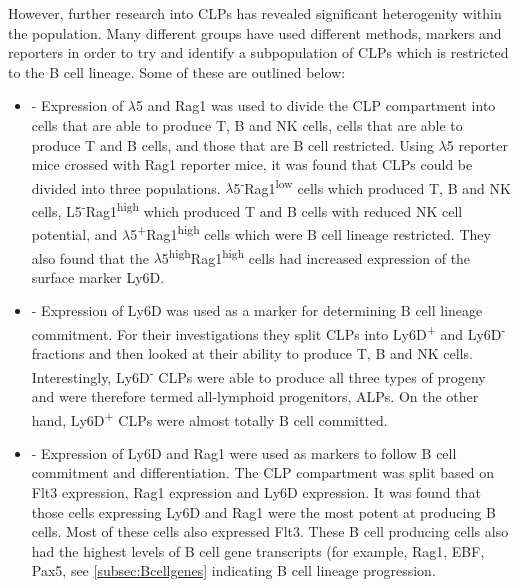 

However, further research into CLPs has revealed significant heterogenity within the population.
Many different groups have used different methods, markers and reporters in order to try and identify a subpopulation of CLPs which is restricted to the B cell lineage. 
Some of these are outlined below:
\begin{itemize}
\item \citet{Mansson2010} - Expression of $\lambda$5 and Rag1 was used to divide the CLP compartment into cells that are able to produce T, B and NK cells, cells that are able to produce T and B cells, and those that are B cell restricted.
Using $\lambda$5 reporter mice crossed with Rag1 reporter mice, it was found that CLPs could be divided into three populations.
$\lambda$5\textsuperscript{-}Rag1\textsuperscript{low} cells which produced T, B and NK cells, L5\textsuperscript{-}Rag1\textsuperscript{high} which produced T and B cells with reduced NK cell potential, and $\lambda$5\textsuperscript{+}Rag1\textsuperscript{high} cells which were B cell lineage restricted.
They also found that the $\lambda$5\textsuperscript{high}Rag1\textsuperscript{high} cells had increased expression of the surface marker Ly6D.
\item \citet{Inlay2009} - Expression of Ly6D was used as a marker for determining B cell lineage commitment.
For their investigations they split CLPs into Ly6D\textsuperscript{+} and Ly6D\textsuperscript{-} fractions and then looked at their ability to produce T, B and NK cells.
Interestingly, Ly6D\textsuperscript{-} CLPs were able to produce all three types of progeny and were therefore termed all-lymphoid progenitors, ALPs.
On the other hand, Ly6D\textsuperscript{+} CLPs were almost totally B cell committed.
\item \citet{Zhang2013} - Expression of Ly6D and Rag1 were used as markers to follow B cell commitment and differentiation.
The CLP compartment was split based on Flt3 expression, Rag1 expression and Ly6D expression.
It was found that those cells expressing Ly6D and Rag1 were the most potent at producing B cells. 
Most of these cells also expressed Flt3.
These B cell producing cells also had the highest levels of B cell gene transcripts (for example, Rag1, EBF, Pax5, see \cref{subsec:Bcellgenes} indicating B cell lineage progression.
\end{itemize}

